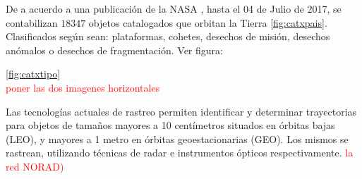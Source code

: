 De a acuerdo a una publicaci\'on de la \ac{NASA} \cite{ODQNum}, hasta el 04 de Julio de 2017, se contabilizan $18347$ objetos catalogados que orbitan la Tierra \ref{fig:catxpais}. Clasificados seg\'un sean: plataformas, cohetes, desechos de misi\'on, desechos an\'omalos o desechos de fragmentaci\'on. Ver figura:{\ref{fig:catxtipo}\\
\textcolor{red}{poner las dos imagenes horizontales}


\begin{figure}[ht]
\end{figure}




Las tecnolog\'ias actuales de rastreo permiten identificar y determinar trayectorias para objetos de tamaños mayores a 10 cent\'imetros situados en \'orbitas bajas (LEO), y mayores a 1 metro en \'orbitas geoestacionarias (GEO). Los mismos se rastrean, utilizando t\'ecnicas de radar e instrumentos \'opticos respectivamente. \textcolor{red}{la red NORAD)}\\

}
